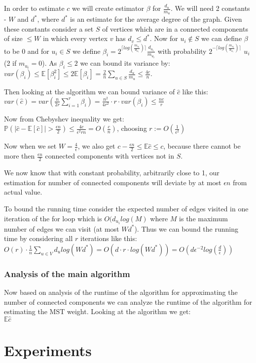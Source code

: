 \documentclass{article}
\begin{document}
In order to estimate $c$ we will create estimator $\beta$ for $\frac{d_u}{m_u}$. We will need 2 constants - $W$ and $d^*$, where $d^*$ is an estimate for the average degree of the graph. Given these constants consider a set $S$ of vertices which are in a connected components of size $\leq W$ in which every vertex $v$ has $d_v \leq d^*$. Now for $u_i \not\in S$ we can define $\beta$ to be $0$ and for $u_i \in S$ we define $\beta_i = 2^{\lceil log(\frac{m_{u_{i}}}{d_{u_i}})\rceil} \frac{d_{u_{i}}}{m_{u_{i}}}$ with probability $2^{-\lceil log(\frac{m_{u_{i}}}{d_{u_{i}}})\rceil}$  $u_i$ (2 if $m_{u_i} = 0$). As $\beta_i \leq 2$ we can bound its variance by: \\
$var(\beta_i) \leq \mathbb{E}[\beta_i^2] \leq 2\mathbb{E}[\beta_i] = \frac{2}{n} \sum\limits_{u \in S}\frac{d_u}{m_u} \leq \frac{4c}{n}$.

Then looking at the algorithm we can bound variance of $\hat c$ like this: \\
$var (\hat c) = var (\frac{n}{2r}\sum\limits_{i=1}^{r}\beta_i) = \frac{n^2}{4r^2}\cdot r \cdot var(\beta_i) \leq \frac{nc}{r}$

Now from Chebyshev inequality we get: \\
$\mathbb{P}(|\hat c - \mathbb{E}[\hat c]| > \frac{\epsilon n}{2}) \leq \frac{4c}{\epsilon^2 r n} = O(\frac{c}{n})$, choosing $r := O(\frac{1}{\epsilon^2})$

Now when we set $W = \frac{4}{\epsilon}$, we also get
$c - \frac{\epsilon n}{2} \leq \mathbb{E} \hat c \leq c$,
because there cannot be more then $\frac{\epsilon n}{2}$ connected components with vertices not in $S$.

We now know that with constant probability, arbitrarily close to 1, our estimation for number of connected components will deviate by at most $\epsilon n$ from actual value.

To bound the running time consider the expected number of edges visited in one iteration of the for loop which is $O(d_{u_i} log(M)$ where $M$ is the maximum number of edges we can visit (at most $Wd^*$). Thus we can bound the running time by considering all $r$ iterations like this: \\
$O(r) \cdot \frac{1}{n}\sum\limits_{u \in V} d_u log(Wd^*) = O(d \cdot  r \cdot log(W d^*)) = O(d\epsilon^{-2} log(\frac{d}{\epsilon}))$

\subsubsection{ Analysis of the main algorithm}
Now based on analysis of the runtime of the algorithm for approximating the number of connected components we can analyze the runtime of the algorithm for estimating the MST weight. Looking at the algorithm we get: \\
$\mathbb{E}\hat c $



\section{Experiments}
\end{document}

